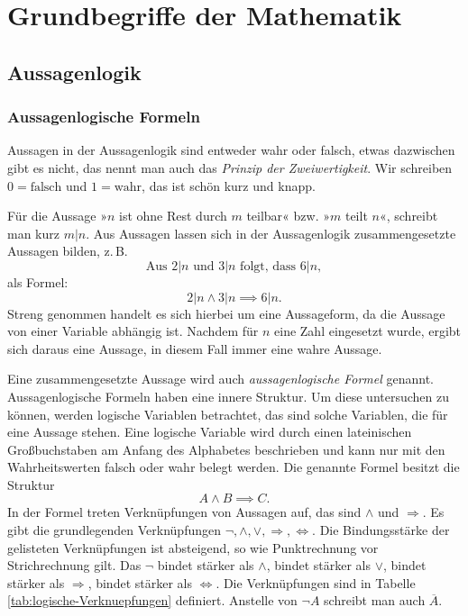 
\chapter{Grundbegriffe der Mathematik}

\section{Aussagenlogik}

\subsection{Aussagenlogische Formeln}

Aussagen in der Aussagenlogik sind entweder wahr oder falsch,
etwas dazwischen gibt es nicht, das nennt man auch das \emph{Prinzip
der Zweiwertigkeit}.
Wir schreiben $0=\text{falsch}$ und $1=\text{wahr}$, das ist schön
kurz und knapp.

Für die Aussage »$n$ ist ohne Rest durch $m$ teilbar« bzw.
»$m$ teilt $n$«, schreibt man kurz $m|n$. Aus Aussagen lassen sich
in der Aussagenlogik zusammengesetzte Aussagen bilden, z.\,B.
\[\text{Aus $2|n$ und $3|n$ folgt, dass $6|n$},\]
als Formel:
\[2|n\land 3|n \implies 6|n.\]
Streng genommen handelt es sich hierbei um eine Aussageform, da die
Aussage von einer Variable abhängig ist. Nachdem für $n$ eine Zahl
eingesetzt wurde, ergibt sich daraus eine Aussage, in diesem Fall
immer eine wahre Aussage.

Eine zusammengesetzte Aussage wird auch \emph{aussagenlogische Formel}
genannt. Aussagenlogische Formeln haben eine innere Struktur. Um diese
untersuchen zu können, werden logische Variablen betrachtet,
das sind solche Variablen, die für eine Aussage stehen. Eine
logische Variable wird durch einen lateinischen Großbuchstaben
am Anfang des Alphabetes beschrieben und kann nur mit den
Wahrheitswerten falsch oder wahr belegt werden. Die genannte Formel
besitzt die Struktur
\[A\land B \implies C.\]
In der Formel treten Verknüpfungen von Aussagen auf, das sind
$\land$ und $\Rightarrow$. Es gibt die grundlegenden Verknüpfungen
$\neg,\land,\lor,\Rightarrow,\Leftrightarrow$. Die Bindungsstärke
der gelisteten Verknüpfungen ist absteigend, so wie Punktrechnung
vor Strichrechnung gilt. Das $\neg$ bindet stärker als $\land$,
bindet stärker als $\lor$, bindet stärker als $\Rightarrow$,
bindet stärker als $\Leftrightarrow$. Die Verknüpfungen sind
in Tabelle \ref{tab:logische-Verknuepfungen} definiert.
Anstelle von $\neg A$ schreibt man auch $\overline A$.

